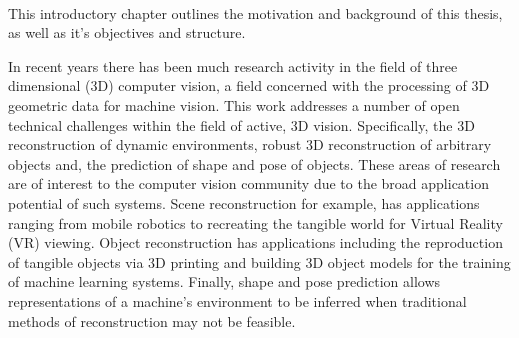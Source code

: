 ~\label{chap:intro}
\begin{chapterabstract}
This introductory chapter outlines the motivation and background of this thesis, as well as it's objectives 
and structure.
\end{chapterabstract}

In recent years there has been much research activity in the field of three dimensional (3D) computer vision, 
a field concerned with the processing of 3D geometric data for machine vision. This work addresses a number of 
open technical challenges within the field of active, 3D vision. Specifically, the 3D reconstruction of dynamic 
environments, robust 3D reconstruction of arbitrary objects and, the prediction of shape and pose of objects. These 
areas of research are of interest to the computer vision community due to the broad application potential of such 
systems. Scene reconstruction for example, has applications ranging from mobile robotics to recreating the tangible 
world for Virtual Reality (VR) viewing. Object reconstruction has applications including the reproduction of tangible 
objects via 3D printing and building 3D object models for the training of machine learning systems. Finally, shape 
and pose prediction allows representations of a machine's environment to be inferred when traditional methods of 
reconstruction may not be feasible.

